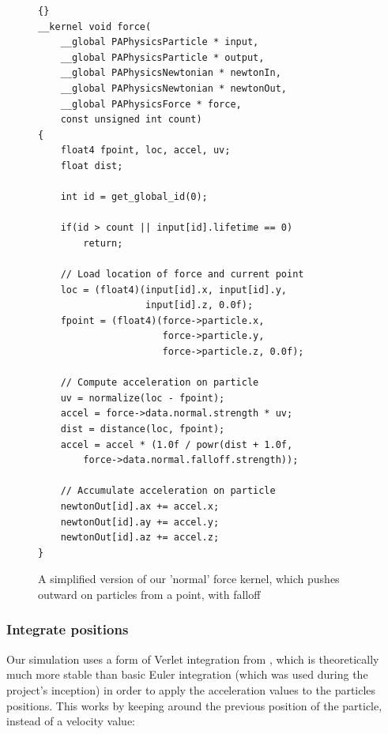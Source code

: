 \documentclass{acmsiggraph}
\begin{document}
\begin{figure}

    \lstset{language=C}
    \lstset{basicstyle=\footnotesize\ttfamily}
    \lstset{numbers=left, numberstyle=\tiny, stepnumber=1, numbersep=5pt}
    \begin{lstlisting}[frame=trbl]{}
__kernel void force(
    __global PAPhysicsParticle * input,
    __global PAPhysicsParticle * output,
    __global PAPhysicsNewtonian * newtonIn,
    __global PAPhysicsNewtonian * newtonOut,
    __global PAPhysicsForce * force,
    const unsigned int count)
{
    float4 fpoint, loc, accel, uv;
    float dist;

    int id = get_global_id(0);

    if(id > count || input[id].lifetime == 0)
        return;

    // Load location of force and current point
    loc = (float4)(input[id].x, input[id].y,
                   input[id].z, 0.0f);
    fpoint = (float4)(force->particle.x,
                      force->particle.y,
                      force->particle.z, 0.0f);

    // Compute acceleration on particle
    uv = normalize(loc - fpoint);
    accel = force->data.normal.strength * uv;
    dist = distance(loc, fpoint);
    accel = accel * (1.0f / powr(dist + 1.0f,
        force->data.normal.falloff.strength));

    // Accumulate acceleration on particle
    newtonOut[id].ax += accel.x;
    newtonOut[id].ay += accel.y;
    newtonOut[id].az += accel.z;
}
    \end{lstlisting}

    \caption{A simplified version of our 'normal' force kernel, which pushes outward on particles from a point, with falloff}
    \label{forceCode}
\end{figure}

\subsubsection{Integrate positions}

Our simulation uses a form of Verlet integration from \cite{verlet}, which is theoretically much more stable than basic Euler integration (which was used during the project's inception) in order to apply the acceleration values to the particles positions. This works by keeping around the previous position of the particle, instead of a velocity value:
\end{document}
